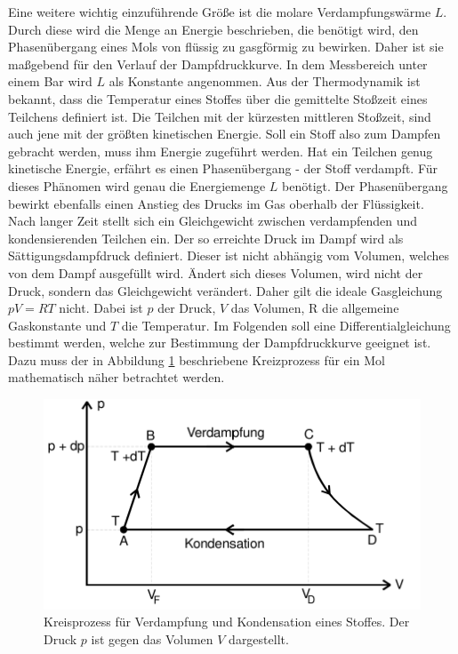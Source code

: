 \noindent
Eine weitere wichtig einzuführende Größe ist die molare Verdampfungswärme $L$. Durch diese wird die Menge an Energie beschrieben, die benötigt wird, den Phasenübergang
eines Mols von flüssig zu gasgförmig zu bewirken.
Daher ist sie maßgebend für den Verlauf der Dampfdruckkurve. In dem Messbereich
unter einem Bar wird $L$ als Konstante angenommen. Aus der Thermodynamik ist bekannt, dass die Temperatur eines Stoffes über die gemittelte Stoßzeit eines Teilchens definiert ist. Die Teilchen
mit der kürzesten mittleren Stoßzeit, sind auch jene mit der größten kinetischen Energie. Soll ein Stoff also zum Dampfen gebracht werden, muss ihm Energie zugeführt werden.
Hat ein Teilchen genug kinetische Energie, erfährt es einen Phasenübergang - der Stoff verdampft. Für dieses Phänomen
wird genau die Energiemenge $L$ benötigt. Der Phasenübergang bewirkt ebenfalls einen Anstieg des Drucks im Gas oberhalb der Flüssigkeit.\\
Nach langer Zeit stellt sich ein Gleichgewicht zwischen verdampfenden und kondensierenden Teilchen ein. Der so erreichte Druck im Dampf
wird als Sättigungsdampfdruck definiert. Dieser ist nicht abhängig vom Volumen, welches von dem Dampf ausgefüllt wird. Ändert sich dieses Volumen, wird nicht der Druck, sondern das Gleichgewicht verändert. 
Daher gilt die ideale Gasgleichung $pV=RT$ nicht. Dabei ist $p$ der Druck, $V$ das Volumen, R die allgemeine Gaskonstante und $T$ die Temperatur. 
Im Folgenden soll eine Differentialgleichung bestimmt werden, welche zur Bestimmung der Dampfdruckkurve geeignet ist.
Dazu muss der in Abbildung \ref{Abb2:Kreisprozess} beschriebene Kreizprozess für ein Mol mathematisch näher betrachtet werden.
\begin{figure}[h!]
    \centering
    \includegraphics[scale=0.8]{sreen2.jpg}
    \caption{Kreisprozess für Verdampfung und Kondensation eines Stoffes. Der Druck $p$ ist
    gegen das Volumen $V$ dargestellt.\cite{V203_Anleitung} }
    \label{Abb2:Kreisprozess}
\end{figure}
